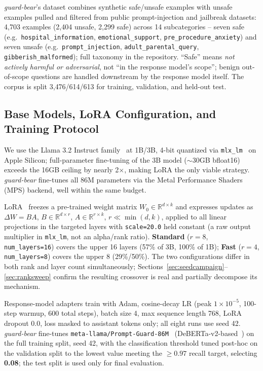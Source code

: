 \documentclass[pdflatex,sn-mathphys-num]{sn-jnl}%
\begin{document}
\textit{guard-bear}'s dataset combines synthetic safe/unsafe examples with unsafe examples pulled and filtered from public prompt-injection and jailbreak datasets: 4{,}703 examples (2{,}404 unsafe, 2{,}299 safe) across 14 subcategories -- seven safe (e.g.\ \texttt{hospital\_information}, \texttt{emotional\_support}, \texttt{pre\_procedure\_anxiety}) and seven unsafe (e.g.\ \texttt{prompt\_injection}, \texttt{adult\_parental\_query}, \texttt{gibberish\_malformed}); full taxonomy in the repository. ``Safe'' means \textit{not actively harmful or adversarial}, not ``in the response model's scope''; benign out-of-scope questions are handled downstream by the response model itself. The corpus is split 3{,}476/614/613 for training, validation, and held-out test.

\subsection{Base Models, LoRA Configuration, and Training Protocol}\label{sec:trainprotocol}

We use the Llama 3.2 Instruct family~\cite{dubey2024llama3} at 1B/3B, 4-bit quantized via \texttt{mlx\_lm}~\cite{apple2023mlx} on Apple Silicon; full-parameter fine-tuning of the 3B model ($\sim$30GB bfloat16) exceeds the 16GB ceiling by nearly 2$\times$, making LoRA the only viable strategy. \textit{guard-bear} fine-tunes all 86M parameters via the Metal Performance Shaders (MPS) backend, well within the same budget.

LoRA~\cite{hu2022lora} freezes a pre-trained weight matrix $W_0 \in \mathbb{R}^{d\times k}$ and expresses updates as $\Delta W = BA$, $B \in \mathbb{R}^{d\times r}$, $A \in \mathbb{R}^{r\times k}$, $r \ll \min(d,k)$, applied to all linear projections in the targeted layers with \texttt{scale=20.0} held constant (a raw output multiplier in \texttt{mlx\_lm}, not an alpha/rank ratio). \textbf{Standard} ($r=8$, \texttt{num\_layers=16}) covers the upper 16 layers (57\% of 3B, 100\% of 1B); \textbf{Fast} ($r=4$, \texttt{num\_layers=8}) covers the upper 8 (29\%/50\%). The two configurations differ in both rank and layer count simultaneously; Sections~\ref{sec:seedcampaign}--\ref{sec:ranksweep} confirm the resulting crossover is real and partially decompose its mechanism.

Response-model adapters train with Adam, cosine-decay LR (peak $1\times10^{-5}$, 100-step warmup, 600 total steps), batch size 4, max sequence length 768, LoRA dropout 0.0, loss masked to assistant tokens only; all eight runs use seed 42. \textit{guard-bear} fine-tunes \texttt{meta-llama/Prompt-Guard-86M}~\cite{promptguard2024} (DeBERTa-v2-based~\cite{he2021deberta}) on the full training split, seed 42, with the classification threshold tuned post-hoc on the validation split to the lowest value meeting the $\geq 0.97$ recall target, selecting \textbf{0.08}; the test split is used only for final evaluation.
\end{document}
